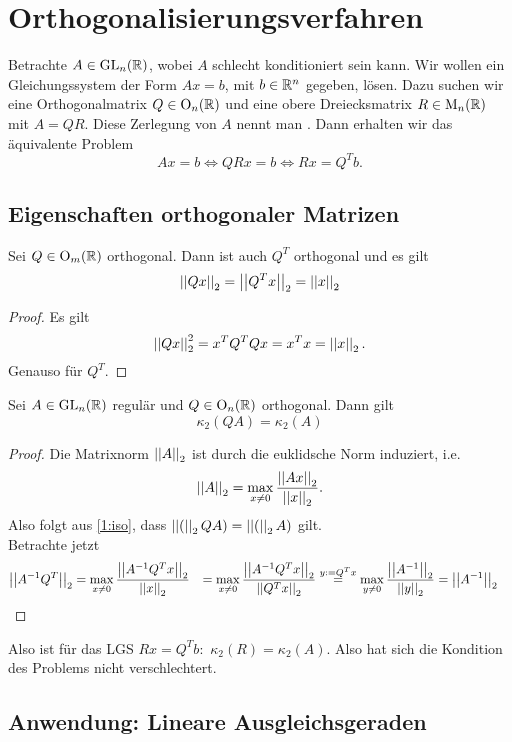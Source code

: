 \chapter{Orthogonalisierungsverfahren}


Betrachte $A\in \operatorname{GL}_{n}(\mathbb{R})$, wobei $A$ schlecht konditioniert sein kann. Wir wollen ein Gleichungssystem der Form $Ax=b$, mit $b\in \mathbb{R}^n$ gegeben, lösen. Dazu suchen wir eine Orthogonalmatrix $Q\in \operatorname{O}_{n}(\mathbb{R})$ und eine obere Dreiecksmatrix $R\in \operatorname{M}_{n}(\mathbb{R})$ mit $A=QR$. Diese Zerlegung von $A$ nennt man . Dann erhalten wir das äquivalente Problem
\[
Ax=b \Longleftrightarrow QRx=b \Longleftrightarrow Rx=Q^T b.
\]


\section{Eigenschaften orthogonaler Matrizen}
\begin{lem}\label{1:iso}
	Sei $Q\in \operatorname{O}_{m}(\mathbb{R})$ orthogonal. Dann ist auch $Q^T$ orthogonal und es gilt
	\[
		\left|\left|Qx\right|\right|_2= \left|\left|Q^Tx\right|\right|_2=\left|\left|x\right|\right|_2
	\]
\end{lem}
\begin{proof}
	Es gilt
	\[
	\left|\left|Qx\right|\right|_2^2 = x^TQ^TQx = x^Tx=\left|\left|x\right|\right|_2.
	\]
	Genauso für $Q^T$.
\end{proof}
\begin{lem}
	Sei $A\in \operatorname{GL}_{n}(\mathbb{R})$ regulär und $Q\in \operatorname{O}_{n}(\mathbb{R})$ orthogonal. Dann gilt
	\[ \kappa_2(QA)=\kappa_2(A)
	\]
\end{lem}
\begin{proof}
	Die Matrixnorm $\left|\left|A\right|\right|_2$ ist durch die euklidsche Norm induziert, i.e.
	\[
	\left|\left|A\right|\right|_2 = \max_{x\neq 0} \frac{\left|\left|Ax\right|\right|_2}{\left|\left|x\right|\right|_2}.
	\]
	Also folgt aus \cref{1:iso}, dass $\left|\left|(\right|\right|_2QA)=\left|\left|(\right|\right|_2A)$ gilt.\\
	Betrachte jetzt
	\begin{align*}
		\left|\left|A^{-1}Q^T\right|\right|_2 &= \max_{x\neq 0}\frac{\left|\left|A^{-1}Q^Tx\right|\right|_2}{\left|\left|x\right|\right|_2}
										&= \max_{x\neq 0}\frac{\left|\left|A^{-1}Q^Tx\right|\right|_2}{\left|\left|Q^Tx\right|\right|_2}
										&\overset{y:=Q^Tx}=  \max_{y\neq 0} \frac{\left|\left|A^{-1}\right|\right|_2}{\left|\left|y\right|\right|_2} = \left|\left|A^{-1}\right|\right|_2
	\end{align*}
\end{proof}
Also ist für das LGS $Rx=Q^Tb:$ $\kappa_2(R)=\kappa_2(A)$. Also hat sich die Kondition des Problems nicht verschlechtert.

\section{Anwendung: Lineare Ausgleichsgeraden}

